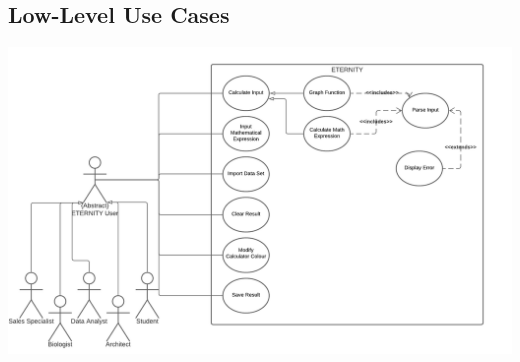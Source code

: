 \documentclass[11pt,onside]{report}
\begin{document}
\subsection{Low-Level Use Cases}
\begin{center}
    \includegraphics[scale=0.6]{images/low-level-use-case.png}
\end{center}

 


\begin{description}

\end{description}
\end{document}
